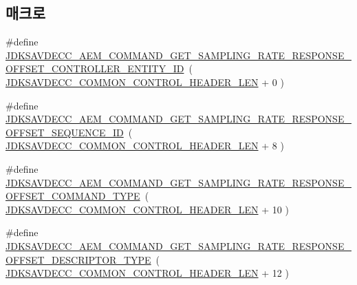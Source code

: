 \subsection*{매크로}
\begin{DoxyCompactItemize}
\item 
\#define \hyperlink{group__command__get__sampling__rate__response_gab5d5763012e1e39df6d42dd48593b2a8}{J\+D\+K\+S\+A\+V\+D\+E\+C\+C\+\_\+\+A\+E\+M\+\_\+\+C\+O\+M\+M\+A\+N\+D\+\_\+\+G\+E\+T\+\_\+\+S\+A\+M\+P\+L\+I\+N\+G\+\_\+\+R\+A\+T\+E\+\_\+\+R\+E\+S\+P\+O\+N\+S\+E\+\_\+\+O\+F\+F\+S\+E\+T\+\_\+\+C\+O\+N\+T\+R\+O\+L\+L\+E\+R\+\_\+\+E\+N\+T\+I\+T\+Y\+\_\+\+ID}~( \hyperlink{group__jdksavdecc__avtp__common__control__header_gaae84052886fb1bb42f3bc5f85b741dff}{J\+D\+K\+S\+A\+V\+D\+E\+C\+C\+\_\+\+C\+O\+M\+M\+O\+N\+\_\+\+C\+O\+N\+T\+R\+O\+L\+\_\+\+H\+E\+A\+D\+E\+R\+\_\+\+L\+EN} + 0 )
\item 
\#define \hyperlink{group__command__get__sampling__rate__response_gafaa8342d0c1065acc1aaf0ceaf1435b4}{J\+D\+K\+S\+A\+V\+D\+E\+C\+C\+\_\+\+A\+E\+M\+\_\+\+C\+O\+M\+M\+A\+N\+D\+\_\+\+G\+E\+T\+\_\+\+S\+A\+M\+P\+L\+I\+N\+G\+\_\+\+R\+A\+T\+E\+\_\+\+R\+E\+S\+P\+O\+N\+S\+E\+\_\+\+O\+F\+F\+S\+E\+T\+\_\+\+S\+E\+Q\+U\+E\+N\+C\+E\+\_\+\+ID}~( \hyperlink{group__jdksavdecc__avtp__common__control__header_gaae84052886fb1bb42f3bc5f85b741dff}{J\+D\+K\+S\+A\+V\+D\+E\+C\+C\+\_\+\+C\+O\+M\+M\+O\+N\+\_\+\+C\+O\+N\+T\+R\+O\+L\+\_\+\+H\+E\+A\+D\+E\+R\+\_\+\+L\+EN} + 8 )
\item 
\#define \hyperlink{group__command__get__sampling__rate__response_ga4d7127c0b71b0536657fb14ae59e3ad2}{J\+D\+K\+S\+A\+V\+D\+E\+C\+C\+\_\+\+A\+E\+M\+\_\+\+C\+O\+M\+M\+A\+N\+D\+\_\+\+G\+E\+T\+\_\+\+S\+A\+M\+P\+L\+I\+N\+G\+\_\+\+R\+A\+T\+E\+\_\+\+R\+E\+S\+P\+O\+N\+S\+E\+\_\+\+O\+F\+F\+S\+E\+T\+\_\+\+C\+O\+M\+M\+A\+N\+D\+\_\+\+T\+Y\+PE}~( \hyperlink{group__jdksavdecc__avtp__common__control__header_gaae84052886fb1bb42f3bc5f85b741dff}{J\+D\+K\+S\+A\+V\+D\+E\+C\+C\+\_\+\+C\+O\+M\+M\+O\+N\+\_\+\+C\+O\+N\+T\+R\+O\+L\+\_\+\+H\+E\+A\+D\+E\+R\+\_\+\+L\+EN} + 10 )
\item 
\#define \hyperlink{group__command__get__sampling__rate__response_gab2589d24fd6298df1a34547e017ee2c6}{J\+D\+K\+S\+A\+V\+D\+E\+C\+C\+\_\+\+A\+E\+M\+\_\+\+C\+O\+M\+M\+A\+N\+D\+\_\+\+G\+E\+T\+\_\+\+S\+A\+M\+P\+L\+I\+N\+G\+\_\+\+R\+A\+T\+E\+\_\+\+R\+E\+S\+P\+O\+N\+S\+E\+\_\+\+O\+F\+F\+S\+E\+T\+\_\+\+D\+E\+S\+C\+R\+I\+P\+T\+O\+R\+\_\+\+T\+Y\+PE}~( \hyperlink{group__jdksavdecc__avtp__common__control__header_gaae84052886fb1bb42f3bc5f85b741dff}{J\+D\+K\+S\+A\+V\+D\+E\+C\+C\+\_\+\+C\+O\+M\+M\+O\+N\+\_\+\+C\+O\+N\+T\+R\+O\+L\+\_\+\+H\+E\+A\+D\+E\+R\+\_\+\+L\+EN} + 12 )

\end{DoxyCompactItemize}
